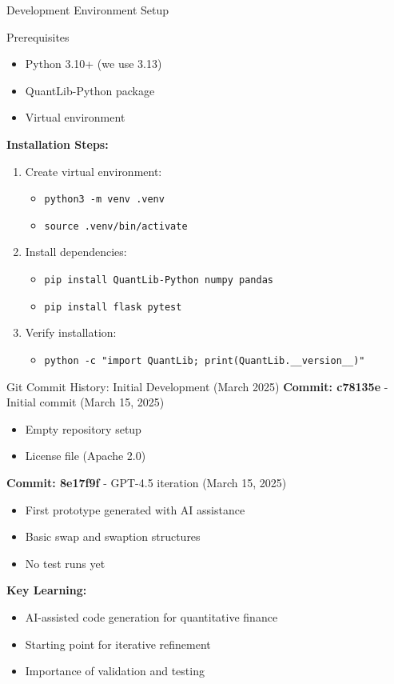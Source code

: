 \documentclass[aspectratio=169,11pt]{beamer}
\begin{document}
\begin{frame}{Development Environment Setup}
\begin{block}{Prerequisites}
\begin{itemize}
    \item Python 3.10+ (we use 3.13)
    \item QuantLib-Python package
    \item Virtual environment
\end{itemize}
\end{block}

\textbf{Installation Steps:}
\begin{enumerate}
    \item Create virtual environment:
    \begin{itemize}
        \item \texttt{python3 -m venv .venv}
        \item \texttt{source .venv/bin/activate}
    \end{itemize}
    \item Install dependencies:
    \begin{itemize}
        \item \texttt{pip install QuantLib-Python numpy pandas}
        \item \texttt{pip install flask pytest}
    \end{itemize}
    \item Verify installation:
    \begin{itemize}
        \item \texttt{python -c "import QuantLib; print(QuantLib.\_\_version\_\_)"}
    \end{itemize}
\end{enumerate}
\end{frame}

\begin{frame}{Git Commit History: Initial Development (March 2025)}
\textbf{Commit: c78135e} - Initial commit (March 15, 2025)
\begin{itemize}
    \item Empty repository setup
    \item License file (Apache 2.0)
\end{itemize}

\textbf{Commit: 8e17f9f} - GPT-4.5 iteration (March 15, 2025)
\begin{itemize}
    \item First prototype generated with AI assistance
    \item Basic swap and swaption structures
    \item No test runs yet
\end{itemize}

\vspace{0.5cm}
\textbf{Key Learning:}
\begin{itemize}
    \item AI-assisted code generation for quantitative finance
    \item Starting point for iterative refinement
    \item Importance of validation and testing
\end{itemize}
\end{frame}
\end{document}
